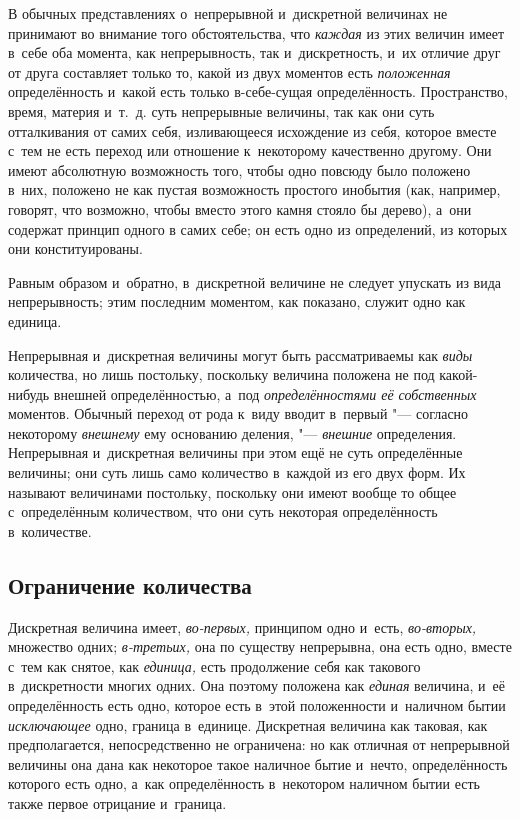 
В обычных представлениях о~непрерывной и~дискретной величинах не принимают во
внимание того обстоятельства, что {\em каждая} из этих величин имеет в~себе оба
момента, как непрерывность, так и~дискретность, и~их отличие друг от друга
составляет только то, какой из двух моментов есть {\em положенная}
определённость и~какой есть только в-себе-сущая определённость. Пространство,
время, материя и~т.~д. суть непрерывные величины, так как они суть отталкивания
от самих себя, изливающееся исхождение из себя, которое вместе с~тем не есть
переход или отношение к~некоторому качественно другому. Они имеют абсолютную
возможность того, чтобы одно повсюду было положено в~них, положено не как
пустая возможность простого инобытия (как, например, говорят, что возможно,
чтобы вместо этого камня стояло бы дерево), а~они содержат принцип одного в
самих себе; он есть одно из определений, из которых они конституированы.

Равным образом и~обратно, в~дискретной величине не следует упускать из вида
непрерывность; этим последним моментом, как показано, служит одно как единица.

Непрерывная и~дискретная величины могут быть рассматриваемы как {\em виды}
количества, но лишь постольку, поскольку величина положена не под какой-нибудь
внешней определённостью, а~под {\em определённостями её собственных} моментов.
Обычный переход от рода к~виду вводит в~первый "--- согласно некоторому
{\em внешнему} ему основанию деления, "--- {\em внешние} определения.
Непрерывная и~дискретная величины при этом ещё не суть определённые величины;
они суть лишь само количество в~каждой из его двух форм. Их называют величинами
постольку, поскольку они имеют вообще то общее с~определённым количеством, что
они суть некоторая определённость в~количестве.

\subsection{Ограничение количества}

Дискретная величина имеет, {\em во-первых,} принципом одно и~есть,
{\em во-вторых,} множество одних; {\em в-третьих,} она по существу непрерывна,
она есть одно, вместе с~тем как снятое, как {\em единица,} есть продолжение
себя как такового в~дискретности многих одних. Она поэтому положена как
{\em единая} величина, и~её определённость есть одно, которое есть в~этой
положенности и~наличном бытии {\em исключающее} одно, граница в~единице.
Дискретная величина как таковая, как предполагается, непосредственно не
ограничена: но как отличная от непрерывной величины она дана как некоторое
такое наличное бытие и~нечто, определённость которого есть одно, а~как
определённость в~некотором наличном бытии есть также первое
отрицание и~граница.

